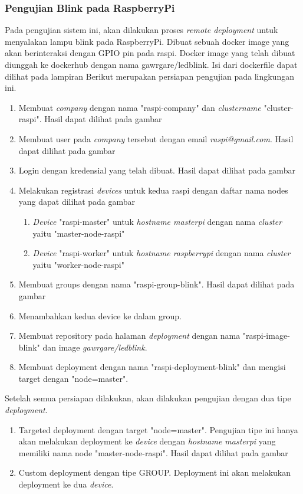 \subsubsection{Pengujian Blink pada RaspberryPi}

Pada pengujian sistem ini, akan dilakukan proses \textit{remote deployment} untuk menyalakan lampu blink pada RaspberryPi. Dibuat sebuah docker image yang akan berinteraksi dengan GPIO pin pada raspi. Docker image yang telah dibuat diunggah ke dockerhub dengan nama {gawrgare/led\textunderscore blink}. Isi dari dockerfile dapat dilihat pada lampiran Berikut merupakan persiapan pengujian pada lingkungan ini.
\begin{enumerate}
  \item Membuat \textit{company} dengan nama "raspi-company" dan \textit{cluster\textunderscore name} "cluster-raspi". Hasil dapat dilihat pada gambar
  \item Membuat user pada \textit{company} tersebut dengan email \textit{raspi@gmail.com}. Hasil dapat dilihat pada gambar
  \item Login dengan kredensial yang telah dibuat. Hasil dapat dilihat pada gambar
  \item Melakukan registrasi \textit{devices} untuk kedua raspi dengan daftar nama nodes yang dapat dilihat pada gambar
        \begin{enumerate}
          \item \textit{Device} "raspi-master" untuk \textit{hostname masterpi} dengan nama \textit{cluster} yaitu "master-node-raspi"
          \item  \textit{Device} "raspi-worker" untuk \textit{hostname raspberrypi} dengan nama \textit{cluster} yaitu "worker-node-raspi"
        \end{enumerate}
  \item Membuat groups dengan nama "raspi-group-blink". Hasil dapat dilihat pada gambar
  \item Menambahkan kedua device ke dalam group.
  \item Membuat repository pada halaman \textit{deployment} dengan nama "raspi-image-blink" dan image\textit{ gawrgare/led\textunderscore blink}.
  \item Membuat deployment dengan nama "raspi-deployment-blink" dan mengisi target dengan "node=master".
\end{enumerate}

Setelah semua persiapan dilakukan, akan dilakukan pengujian dengan dua tipe \textit{deployment}.
\begin{enumerate}
  \item Targeted deployment dengan target "node=master". Pengujian tipe ini hanya akan melakukan deployment ke \textit{device} dengan \textit{hostname masterpi} yang memiliki nama node "master-node-raspi". Hasil dapat dilihat pada gambar
  \item Custom deployment dengan tipe GROUP. Deployment ini akan melakukan deployment ke dua \textit{device}.
\end{enumerate}

